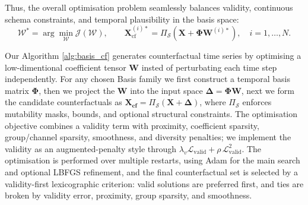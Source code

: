 \documentclass[runningheads]{llncs}
\begin{document}
	
	
	
	Thus, the overall optimisation problem seamlessly balances validity, continuous schema constraints, and temporal plausibility in the basis space:
	\begin{equation}
		\label{eq:cf_optimisation_problem_final}
		\mathcal{W}^{*}
		=
		\arg\min_{\mathcal{W}} \mathcal{J}(\mathcal{W}),
		\qquad
		\mathbf{X}_{\mathrm{cf}}^{(i)*}
		=
		\Pi_{\mathcal{S}}\!\left(\mathbf{X}+\mathbf{\Phi}\mathbf{W}^{(i)*}\right),
		\quad i=1,\dots,N.
	\end{equation}
	
	Our Algorithm \ref{alg:basis_cf} generates counterfactual time series by optimising a low-dimentional coefficient tensor $\mathbf{W}$ insted of perturbating each time step independently. For any chosen Basis family we first construct a temporal basis matrix $\mathbf{\Phi}$, then we project the $\mathbf{W}$ into the input space $\mathbf{\Delta} = \mathbf{\Phi W}$, next we form the candidate counterfactuals as $\mathbf{X_{cf}} = \Pi_{\mathcal{S}}(\mathbf{X} + \mathbf{\Delta})$, where $\Pi_{\mathcal{S}}$ enforces mutability masks, bounds, and optional structural constraints. The optimisation objective combines a validity term with proximity, coefficient sparsity, group/channel sparsity, smoothness, and diversity penalties; we implement the validity as an augmented-penalty style through $\lambda_v \mathcal{L}_{\mathrm{valid}}
	+\rho\,\mathcal{L}_{\mathrm{valid}}^{2}$. The optimisation is performed over multiple restarts, using Adam \cite{2015-kingma} for the main search and optional LBFGS\cite{liu1989limited} refinement, and the final counterfactual set is selected by a validity-first lexicographic criterion: valid solutions are preferred first, and ties are broken by validity error, proximity, group sparsity, and smoothness.
	
\end{document}
